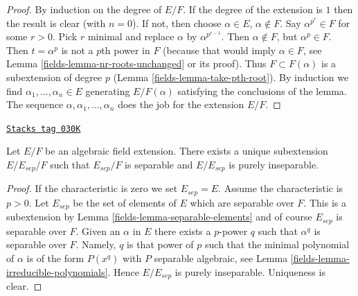 \begin{proof}

By induction on the degree of $E/F$. If the degree of the extension is $1$
then the result is clear (with $n = 0$). If not, then choose
$\alpha \in E$, $\alpha \not \in F$. Say $\alpha^{p^r} \in F$ for some
$r > 0$. Pick $r$ minimal and replace $\alpha$ by $\alpha^{p^{r - 1}}$.
Then $\alpha \not \in F$, but $\alpha^p \in F$. Then $t = \alpha^p$ is not
a $p$th power in $F$ (because that would imply $\alpha \in F$, see
Lemma \ref{fields-lemma-nr-roots-unchanged} or its proof).
Thus $F \subset F(\alpha)$ is a subextension of degree $p$
(Lemma \ref{fields-lemma-take-pth-root}). By induction we find
$\alpha_1, \ldots, \alpha_n \in E$ generating $E/F(\alpha)$
satisfying the conclusions of the lemma.
The sequence $\alpha, \alpha_1, \ldots, \alpha_n$ does the job
for the extension $E/F$.
\end{proof}

\begin{lemma}
\label{fields-lemma-separable-first}
\href{https://stacks.math.columbia.edu/tag/030K}{\texttt{Stacks tag 030K}}


Let $E/F$ be an algebraic field extension. There exists a unique subextension
$E/E_{sep}/F$ such that $E_{sep}/F$ is separable and $E/E_{sep}$ is
purely inseparable.
\end{lemma}

\begin{proof}

If the characteristic is zero we set $E_{sep} = E$. Assume the characteristic
is $p > 0$. Let $E_{sep}$ be the set of elements of $E$ which are separable
over $F$. This is a subextension by Lemma \ref{fields-lemma-separable-elements}
and of course $E_{sep}$ is separable over $F$. Given an $\alpha$ in $E$
there exists a $p$-power $q$ such that $\alpha^q$ is separable over $F$.
Namely, $q$ is that power of $p$ such that the minimal polynomial of
$\alpha$ is of the form $P(x^q)$ with $P$ separable algebraic, see
Lemma \ref{fields-lemma-irreducible-polynomials}. Hence $E/E_{sep}$ is purely
inseparable. Uniqueness is clear.
\end{proof}

